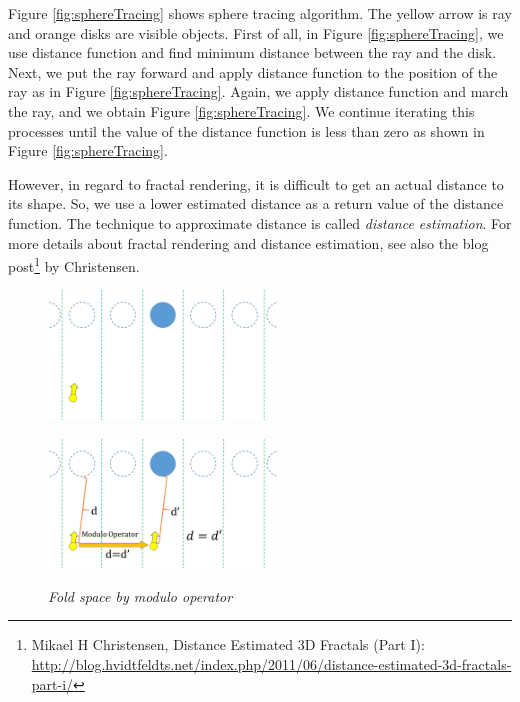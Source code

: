 Figure \ref{fig:sphereTracing} shows sphere tracing algorithm.
The yellow arrow is ray and orange disks are visible objects.
First of all, in Figure \ref{fig:sphereTracing},
we use distance function and find minimum distance between
the ray and the disk.
Next, we put the ray forward and apply distance function to the position
of the ray as in Figure \ref{fig:sphereTracing}.
Again, we apply distance function and march the ray, and we obtain
Figure \ref{fig:sphereTracing}.
We continue iterating this processes until the value of the distance
function is less than zero as shown in Figure \ref{fig:sphereTracing}.

However, in regard to fractal rendering, it is difficult to
get an actual distance to its shape. So, we use a lower estimated distance
as a return value of the distance function. The technique to approximate
distance is called \textit{distance estimation}.
For more details about fractal rendering and distance estimation, see also the blog
post\footnote{Mikael H Christensen, Distance Estimated 3D Fractals (Part I):\\ \quad\quad
\url{http://blog.hvidtfeldts.net/index.php/2011/06/distance-estimated-3d-fractals-part-i/}}
by Christensen. 

\begin{figure}[htbp]
 \begin{minipage}[t]{0.5\hsize}
  \center
  \includegraphics[height=1.35in, keepaspectratio]{img/visualization/translate1.png}
  \subcaption{\textit{}}
  \label{fig:modulo1}
  \hspace*{\fill}
 \end{minipage}
 \begin{minipage}[t]{0.5\hsize}
  \center
  \includegraphics[height=1.35in, keepaspectratio]{img/visualization/translate2.png}
  \subcaption{\textit{}}
  \label{fig:modulo2}
  \hspace*{\fill}
 \end{minipage}
 \caption{\textit{Fold space by modulo operator}}
 \label{fig:moduloAll}
\end{figure}


